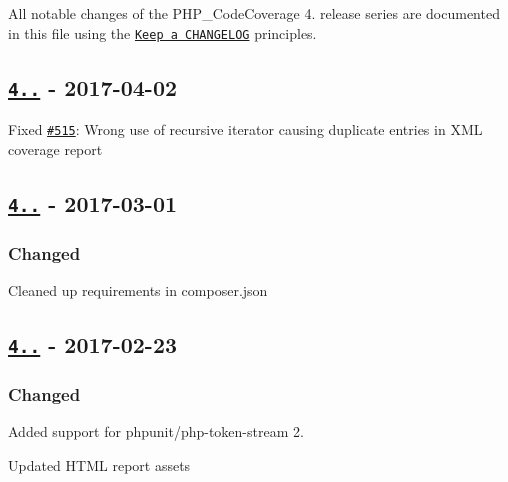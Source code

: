 All notable changes of the P\+H\+P\+\_\+\+Code\+Coverage 4. release series are documented in this file using the \href{http://keepachangelog.com/}{\tt Keep a C\+H\+A\+N\+G\+E\+L\+OG} principles.

\subsection*{\href{https://github.com/sebastianbergmann/php-code-coverage/compare/4.0.7...4.0.8}{\tt 4..} -\/ 2017-\/04-\/02}


\begin{DoxyItemize}
\item Fixed \href{https://github.com/sebastianbergmann/php-code-coverage/pull/515}{\tt \#515}\+: Wrong use of recursive iterator causing duplicate entries in X\+ML coverage report
\end{DoxyItemize}

\subsection*{\href{https://github.com/sebastianbergmann/php-code-coverage/compare/4.0.6...4.0.7}{\tt 4..} -\/ 2017-\/03-\/01}

\subsubsection*{Changed}


\begin{DoxyItemize}
\item Cleaned up requirements in {\ttfamily composer.\+json}
\end{DoxyItemize}

\subsection*{\href{https://github.com/sebastianbergmann/php-code-coverage/compare/4.0.5...4.0.6}{\tt 4..} -\/ 2017-\/02-\/23}

\subsubsection*{Changed}


\begin{DoxyItemize}
\item Added support for {\ttfamily phpunit/php-\/token-\/stream} 2.
\item Updated H\+T\+ML report assets
\end{DoxyItemize}

